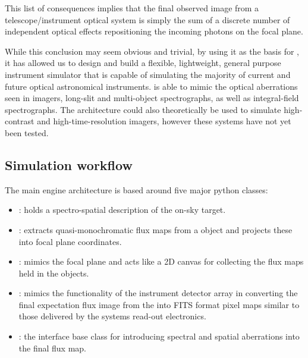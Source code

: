 This list of consequences implies that the final observed image from a telescope/instrument optical system is simply the sum of a discrete number of independent optical effects repositioning the incoming photons on the focal plane.

While this conclusion may seem obvious and trivial, by using it as the basis for \ScopeSim{}, it has allowed us to design and build a flexible, lightweight, general purpose instrument simulator that is capable of simulating the majority of current and future optical astronomical instruments.
\ScopeSim{} is able to mimic the optical aberrations seen in imagers, long-slit and multi-object spectrographs, as well as integral-field spectrographs.
The architecture could also theoretically be used to simulate high-contrast and high-time-resolution imagers, however these systems have not yet been tested.


\subsection{Simulation workflow}
\label{simulation-workflow}

The main \ScopeSim{} engine architecture is based around five major python classes:

\begin{itemize}
\item \textbf{\Source{}}: holds a spectro-spatial description of the on-sky target.

\item \textbf{\FieldOfView{}}: extracts quasi-monochromatic flux maps from a \Source{} object and projects these into focal plane coordinates.

\item \textbf{\ImagePlane{}}: mimics the focal plane and acts like a 2D canvas for collecting the flux maps held in the \FieldOfView{} objects.

\item \textbf{\DetectorArray}: mimics the functionality of the instrument detector array in converting the final expectation flux image from the \ImagePlane{} into FITS format pixel maps similar to those delivered by the systems read-out electronics.

\item \textbf{\Effect{}}: the interface base class for introducing spectral and spatial aberrations into the final flux map.
\end{itemize}

